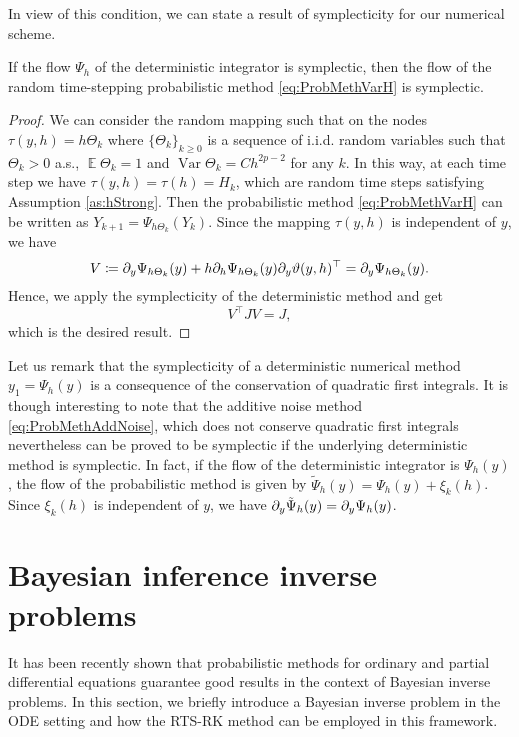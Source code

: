 \documentclass{siamart1116}
\numberwithin{theorem}{section}
\newcommand{\pdv}[2]{\ensuremath\partial_{#2}#1}
\newcommand{\defeq}{\coloneqq}
\newcommand{\Var}{\operatorname{Var}}
\newcommand{\E}{\operatorname{\mathbb{E}}}
\begin{document}
In view of this condition, we can state a result of symplecticity for our numerical scheme.
\begin{theorem}\label{thm:SymplecticRandH} If the flow $\Psi_h$ of the deterministic integrator is symplectic, then the flow of the random time-stepping probabilistic method \eqref{eq:ProbMethVarH} is symplectic.
\end{theorem}
\begin{proof} We can consider the random mapping such that on the nodes $\tau(y, h) = h\Theta_k$ where $\{\Theta_k\}_{k \geq 0}$ is a sequence of i.i.d. random variables such that $\Theta_k > 0$ a.s., $\E\Theta_k = 1$ and $\Var\Theta_k = Ch^{2p - 2}$ for any $k$. In this way, at each time step we have $\tau(y, h) = \tau(h) = H_k$, which are random time steps satisfying Assumption \ref{as:hStrong}. Then the probabilistic method \eqref{eq:ProbMethVarH} can be written as $Y_{k+1} = \Psi_{h\Theta_k}(Y_{k})$. Since the mapping $\tau(y, h)$ is independent of $y$, we have
\begin{equation}
	V \defeq \pdv{\Psi_{h\Theta_k}(y)}{y} + h\pdv{\Psi_{h\Theta_k}(y)}{h}\pdv{\vartheta(y, h)}{y}^\top  = \pdv{\Psi_{h\Theta_k}(y)}{y}.
\end{equation}
Hence, we apply the symplecticity of the deterministic method and get
\begin{equation}
	V^\top  J V = J,
\end{equation}
which is the desired result.
\end{proof}

\begin{remark} Let us remark that the symplecticity of a deterministic numerical method $y_1 = \Psi_h(y)$ is a consequence of the conservation of quadratic first integrals. It is though interesting to note that the additive noise method \eqref{eq:ProbMethAddNoise}, which does not conserve quadratic first integrals nevertheless can be proved to be symplectic if the underlying deterministic method is symplectic. In fact, if the flow of the deterministic integrator is $\Psi_h(y)$, the flow of the probabilistic method is given by $\tilde\Psi_h(y) = \Psi_h(y) + \xi_k(h)$. Since $\xi_k(h)$ is independent of $y$, we have $\pdv{\tilde\Psi_h(y)}{y} = \pdv{\Psi_h(y)}{y}$.	
\end{remark}

\section{Bayesian inference inverse problems}\label{sec:BayesianInference} It has been recently shown \cite{CGS16} that probabilistic methods for ordinary and partial differential equations guarantee good results in the context of Bayesian inverse problems. In this section, we briefly introduce a Bayesian inverse problem in the ODE setting and how the RTS-RK method can be employed in this framework. 
\end{document}
